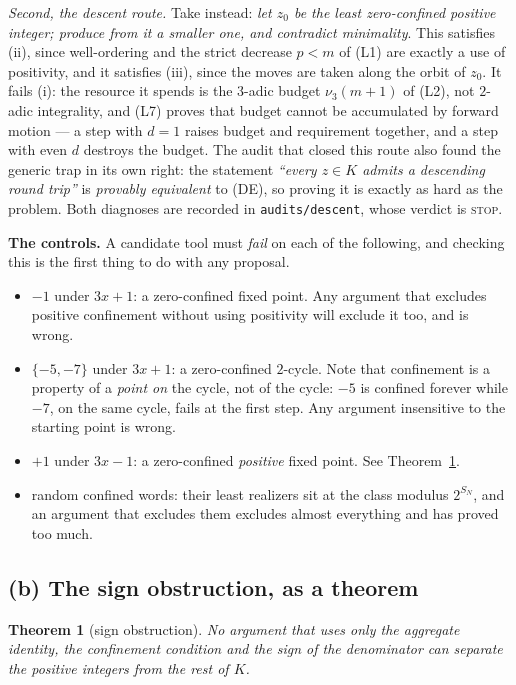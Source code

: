 \documentclass[11pt,reqno]{amsart}
\theoremstyle{plain}
\newtheorem{theorem}{Theorem}[section]
\theoremstyle{definition}
\newcommand{\vth}{\nu_3}
\begin{document}
\emph{Second, the descent route.} Take instead: \emph{let $z_0$ be the least
zero-confined positive integer; produce from it a smaller one, and contradict
minimality}. This satisfies (ii), since well-ordering and the strict decrease
$p<m$ of \textup{(L1)} are exactly a use of positivity, and it satisfies (iii),
since the moves are taken along the orbit of $z_0$. It fails (i): the resource it
spends is the $3$-adic budget $\vth(m+1)$ of \textup{(L2)}, not $2$-adic
integrality, and \textup{(L7)} proves that budget cannot be accumulated by
forward motion --- a step with $d=1$ raises budget and requirement together, and a
step with even $d$ destroys the budget. The audit that closed this route also
found the generic trap in its own right: the statement \emph{``every $z\in K$
admits a descending round trip''} is \emph{provably equivalent} to
\textup{(DE)}, so proving it is exactly as hard as the problem. Both diagnoses
are recorded in \texttt{audits/descent}, whose verdict is \textsc{stop}.

\medskip
\noindent\textbf{The controls.} A candidate tool must \emph{fail} on each of the
following, and checking this is the first thing to do with any proposal.
\begin{itemize}
\item $-1$ under $3x+1$: a zero-confined fixed point. Any argument that excludes
positive confinement without using positivity will exclude it too, and is wrong.
\item $\{-5,-7\}$ under $3x+1$: a zero-confined $2$-cycle. Note that confinement
is a property of a \emph{point on} the cycle, not of the cycle: $-5$ is confined
forever while $-7$, on the same cycle, fails at the first step. Any argument
insensitive to the starting point is wrong.
\item $+1$ under $3x-1$: a zero-confined \emph{positive} fixed point. See
Theorem~\ref{thm:signobstruction}.
\item random confined words: their least realizers sit at the class modulus
$2^{S_N}$, and an argument that excludes them excludes almost everything and has
proved too much.
\end{itemize}

\subsection*{(b) The sign obstruction, as a theorem}

\begin{theorem}[sign obstruction]\label{thm:signobstruction}
No argument that uses only the aggregate identity, the confinement condition and
the sign of the denominator can separate the positive integers from the rest of
$K$.
\end{theorem}
\end{document}
